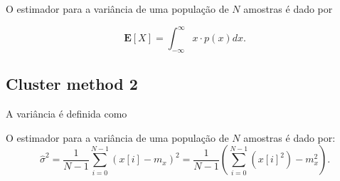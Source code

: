 O estimador para a variância de uma população de $N$ amostras é dado por

\begin{equation}
	\mathbf{E}[X] = \int_{-\infty}^{\infty} x \cdot p(x) dx.
\end{equation}

\subsection{Cluster method 2}

A variância é definida como

O estimador para a variância de uma população de $N$ amostras é dado por:
\begin{equation}
\hat{\sigma}^2 = \frac{1}{N-1}\sum_{i=0}^{N-1}(x[i] - m_x)^2 = \frac{1}{N-1}\left(\sum_{i=0}^{N-1}(x[i]^2) - m_x^2\right).
\end{equation}


